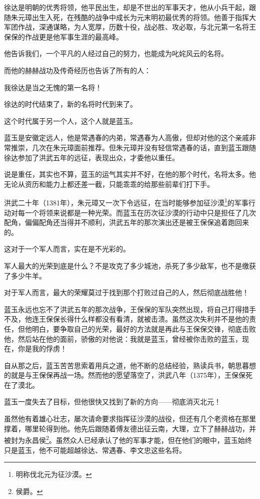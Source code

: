\begin{multicols}{\theparacolNo}
		徐达是明朝的优秀将领，他平民出生，却是不世出的军事天才，他从小兵干起，跟随朱元璋出生入死，在残酷的战争中成长为元末明初最优秀的将领。他善于指挥大军团作战，深通谋略，为人宽厚，历数十役，战必胜、攻必取，与北元第一名将王保保的作战更是他军事生涯的最高峰。

		他告诉我们，一个平凡的人经过自己的努力，也能成为叱姹风云的名将。

		而他的赫赫战功及传奇经历也告诉了所有的人：

		我徐达是当之无愧的第一名将！

		徐达的时代结束了，新的名将时代到来了。

		这个时代属于另一个人，这个人就是蓝玉。

		蓝玉是安徽定远人，他是常遇春的内弟，常遇春为人高傲，但却对他的这个亲戚非常推崇，几次在朱元璋面前推荐。但朱元璋并没有轻信常遇春的话，直到蓝玉跟随徐达参加了洪武五年的远征，表现出众，才委他以重任。

		说是重任，其实也不算，蓝玉的运气其实并不好，在他的那个时代，名将太多。他无论从资历和能力上都还差一截，只能乖乖的给那些前辈们打下手。

		洪武二十年（1381年），朱元璋又一次下令远征，在当时能够参加征沙漠\footnote{明称伐北元为征沙漠。}的军事行动对每一个将领来说都是一种光荣。而蓝玉在历次征沙漠的行动中只是担任了几次配角，偏偏配角还当得并不顺利，洪武五年的那次演出还是被王保保追着跑回来的。

		这对于一个军人而言，实在是不光彩的。

		军人最大的光荣到底是什么？不是攻克了多少城池，杀死了多少敌军，也不是缴获了多少牛羊。

		对于军人而言，最大的荣耀莫过于找到那个打败过自己的人，然后彻底战胜他！

		蓝玉永远也忘不了洪武五年的那次战争，王保保的军队突然出现，将自己打得措手不及，他连王保保长得什么样都没有看清，就被击溃。虽然这次失利并不是他的责任，但他明白，要争取自己的光荣，最好的方法就是再此与王保保交锋，彻底击败他，然后站在他的面前，骄傲的对他说：我就是蓝玉，曾经被你击败的蓝玉，现在，你是我的俘虏！

		自从那之后，蓝玉苦苦思索着用兵之道，他不断的总结经验，熟读兵书，朝思暮想的就是与王保保再战一场。然而他的愿望落空了，洪武八年（1375年），王保保死在了漠北。

		蓝玉一度失去了目标，但他很快又找到了新的方向——彻底消灭北元！

		虽然他有着雄心壮志，屡次请命要求指挥征沙漠的战役，但还有几个老资格在那里撑着，哪里轮得到他。他先后跟随着傅友德出征云南，大理，立下了赫赫战功，并被封为永昌侯\footnote{侯爵。}。虽然众人已经承认了他的军事才能，但在他们的眼中，蓝玉始终只是蓝玉，他不可能超越徐达、常遇春、李文忠这些名将。


\end{multicols}
